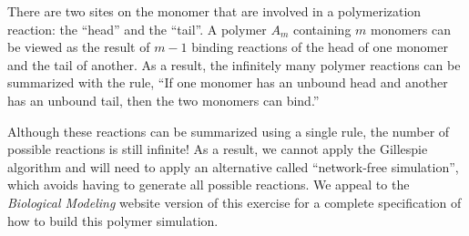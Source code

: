 There are two sites on the monomer  that are involved in a polymerization reaction: the ``head'' and the ``tail''. A polymer $A_m$ containing $m$ monomers can be viewed as the result of $m-1$ binding reactions of the head of one monomer and the tail of another. As a result, the infinitely many polymer reactions can be summarized with the rule, ``If one monomer has an unbound head and another has an unbound tail, then the two monomers can bind.''

Although these reactions can be summarized using a single rule, the number of possible reactions is still infinite! As a result, we cannot apply the Gillespie algorithm and will need to apply an alternative called ``network-free simulation'', which avoids having to generate all possible reactions. We appeal to the \textit{Biological Modeling} website version of this exercise for a complete specification of how to build this polymer simulation.\\

\begin{exercise}\end{exercise}

\begin{exercise}\end{exercise}

\newpage

\phantom{x}
\newpage
